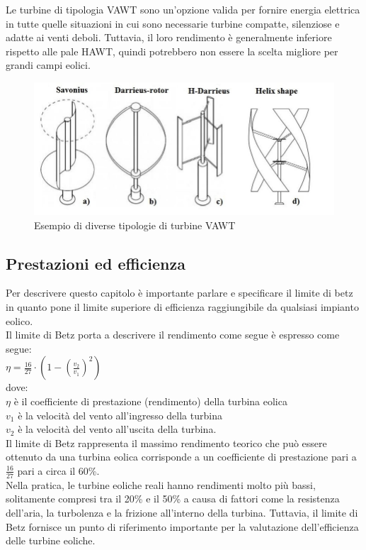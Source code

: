 Le turbine di tipologia VAWT sono un'opzione valida per fornire energia elettrica in tutte quelle situazioni in cui sono necessarie turbine compatte, silenziose e adatte ai venti deboli.
Tuttavia, il loro rendimento è generalmente inferiore rispetto alle pale HAWT, quindi potrebbero non essere la scelta migliore per grandi campi eolici.
\begin{figure}[H]
    \centering
    \includegraphics[height=0.3\textwidth]{res/cap 3/VAWT}
    \caption{Esempio di diverse tipologie di turbine VAWT}
\end{figure}\noindent
\subsection{Prestazioni ed efficienza}
Per descrivere questo capitolo è importante parlare e specificare il limite di betz in quanto pone il limite superiore di efficienza raggiungibile da qualsiasi impianto eolico.\\
Il limite di Betz porta a descrivere il rendimento come segue è espresso come segue:\\
{\large$\eta = \frac{16}{27} \cdot (1 - (\frac{v_2}{v_1})^2)$}\\
dove:\\
{\large$\eta$} è il coefficiente di prestazione (rendimento) della turbina eolica\\
{\large$v_1$} è la velocità del vento all'ingresso della turbina\\
{\large$v_2$} è la velocità del vento all'uscita della turbina.\\
Il limite di Betz rappresenta il massimo rendimento teorico che può essere ottenuto da una turbina eolica corrisponde a un coefficiente di prestazione pari a $\frac{16}{27}$ pari a circa il 60\%.\\
Nella pratica, le turbine eoliche reali hanno rendimenti molto più bassi, solitamente compresi tra il 20\% e il 50\% a causa di fattori come la resistenza dell'aria, la turbolenza e la frizione all'interno della turbina. Tuttavia, il limite di Betz fornisce un punto di riferimento importante per la valutazione dell'efficienza delle turbine eoliche.
